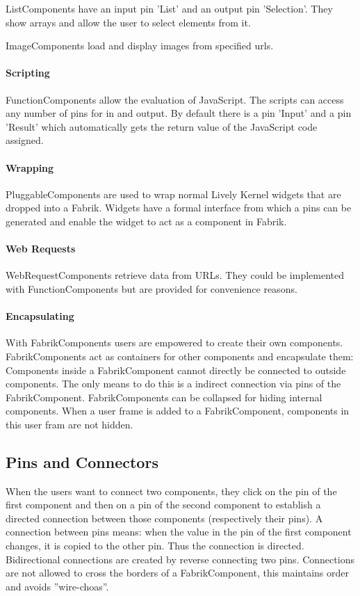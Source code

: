 \documentclass[pdftex, times, 10pt, twocolumn]{article}
\begin{document}
ListComponents have an input pin 'List' and an output pin 'Selection'. They show arrays and allow the user to select elements from it. 

ImageComponents load and display images from specified urls. 



\paragraph{Scripting}
FunctionComponents allow the evaluation of JavaScript. The scripts can access any  number of pins for in and output. By default there is a pin 'Input' and a pin 'Result' which automatically gets the return value of the JavaScript code assigned. 



\paragraph{Wrapping}
PluggableComponents are used to wrap normal Lively Kernel widgets that are dropped into a Fabrik. Widgets have a formal interface from which a pins can be generated and enable the widget to act as a component in Fabrik.  



\paragraph{Web Requests}
WebRequestComponents retrieve data from URLs. They could be implemented with FunctionComponents but are provided for convenience reasons.   



\paragraph{Encapsulating}
With FabrikComponents users are empowered to create their own components. FabrikComponents act as containers for other components and encapsulate them: Components inside a FabrikComponent cannot directly be connected to outside components. The only means to do this is a indirect connection via pins of the FabrikComponent. FabrikComponents can be collapsed for hiding internal components. When a user frame is added to a FabrikComponent, components in this user fram are not hidden.  



\subsection{Pins and Connectors}
When the users want to connect two components, they click on the pin of the first component and then on a pin of the second component to establish a directed connection between those components (respectively their pins). A connection between pins means: when the value in the pin of the first component changes, it is copied to the other pin. Thus the connection is directed. Bidirectional connections are created by reverse connecting two pins. Connections are not allowed to cross the borders of a FabrikComponent, this maintains order and avoids ''wire-choas''. 
\end{document}
